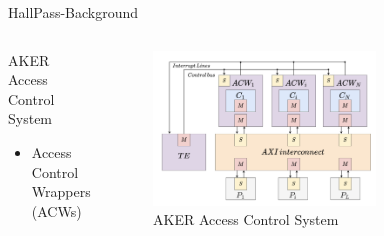 \begin{frame}{HallPass-Background}
    \begin{columns}
        \begin{column}{0.5\textwidth}
            AKER Access Control System
            \begin{itemize}
                \item Access Control Wrappers (ACWs)
            \end{itemize}
        \end{column}
        \begin{column}{0.5\textwidth}
            \begin{figure}
            \centering
            \includegraphics[height=0.7\textheight,width=0.7\textwidth,keepaspectratio]{aker.png}
            \caption{AKER Access Control System}
            \end{figure}
        \end{column}
    \end{columns}
\end{frame}

